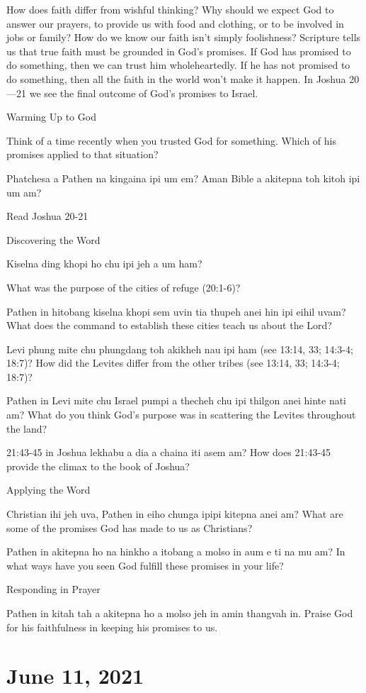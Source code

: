 \documentclass[11pt]{article}
\begin{document}
How does faith differ from wishful thinking? Why should we expect God
to answer our prayers, to provide us with food and clothing, or to be
involved in jobs or family? How do we know our faith isn't simply
foolishness? Scripture tells us that true faith must be grounded in
God's promises. If God has promised to do something, then we can trust
him wholeheartedly. If he has not promised to do something, then all
the faith in the world won't make it happen. In Joshua 20—21 we see
the final outcome of God's promises to Israel.

Warming Up to God

Think of a time recently when you trusted God for something. Which of
his promises applied to that situation?

Phatchesa a Pathen na kingaina ipi um em? Aman Bible a akitepna toh kitoh ipi um am?

Read Joshua 20-21

Discovering the Word

Kiselna ding khopi ho chu ipi jeh a um ham?

What was the purpose of the cities of refuge (20:1-6)?

Pathen in hitobang kiselna khopi sem uvin tia thupeh anei hin ipi eihil uvam?
What does the command to establish these cities teach us about the Lord?

Levi phung mite chu phungdang toh akikheh nau ipi ham (see 13:14, 33; 14:3-4; 18:7)?
How did the Levites differ from the other tribes (see 13:14, 33; 14:3-4; 18:7)?

Pathen in Levi mite chu Israel pumpi a thecheh chu ipi thilgon anei hinte nati am?
What do you think God's purpose was in scattering the Levites throughout the land?

21:43-45 in Joshua lekhabu a dia a chaina iti asem am?
How does 21:43-45 provide the climax to the book of Joshua?

Applying the Word

Christian ihi jeh uva, Pathen in eiho chunga ipipi kitepna anei am?
What are some of the promises God has made to us as Christians?

Pathen in akitepna ho na hinkho a itobang a molso in aum e ti na mu am?
In what ways have you seen God fulfill these promises in your life?

Responding in Prayer

Pathen in kitah tah a akitepna ho a molso jeh in amin thangvah in.
Praise God for his faithfulness in keeping his promises to us.
\section{June 11, 2021}
\label{sec:org678289e}
\end{document}
